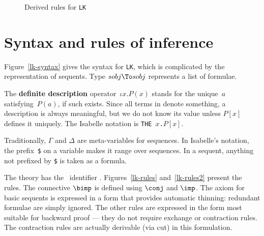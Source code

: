 \begin{figure} 

\caption{Derived rules for {\tt LK}} \label{lk-derived}
\end{figure}


\section{Syntax and rules of inference}
Figure~\ref{lk-syntax} gives the syntax for {\tt LK}, which is complicated
by the representation of sequents.  Type $sobj\To sobj$ represents a list
of formulae.

The {\bf definite description} operator~$\iota x.P(x)$ stands for the
unique~$a$ satisfying~$P(a)$, if such exists.  Since all terms in \LK{}
denote something, a description is always meaningful, but we do not know
its value unless $P[x]$ defines it uniquely.  The Isabelle notation is
\hbox{\tt THE $x$.$P[x]$}.

Traditionally, \(\Gamma\) and \(\Delta\) are meta-variables for sequences.
In Isabelle's notation, the prefix~\verb|$| on a variable makes it range
over sequences.  In a sequent, anything not prefixed by \verb|$| is taken
as a formula.

The theory has the \ML\ identifier .
Figures~\ref{lk-rules} and~\ref{lk-rules2} present the rules.  The
connective $\bimp$ is defined using $\conj$ and $\imp$.  The axiom for
basic sequents is expressed in a form that provides automatic thinning:
redundant formulae are simply ignored.  The other rules are expressed in
the form most suitable for backward proof --- they do not require exchange
or contraction rules.  The contraction rules are actually derivable (via
cut) in this formulation.


